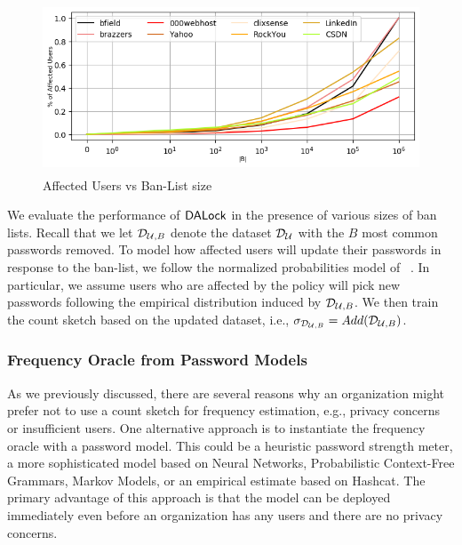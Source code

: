 \begin{figure}[htb]	
	\begin{center}
		\includegraphics[height=2in,width=\linewidth]{Figures/Experiments/AffectedUsers}
		\caption{Affected Users vs Ban-List size}\label{figure: affectedusers}
	\end{center}
\end{figure}




We evaluate the performance of $\mathsf{DALock}$ in the presence of various sizes of ban lists. Recall that we let $\mathcal{D}_{{\mathcal{U}, B}}$ denote the dataset $\mathcal{D}_{{\mathcal{U}}}$ with the $B$ most common passwords removed. To model how affected users will update their passwords in response to the ban-list, we follow the normalized probabilities model of ~\cite{BKPS:ACMEC13}. In particular, we assume users who are affected by the policy will pick new passwords following the empirical distribution induced by $\mathcal{D}_{{\mathcal{U}, B}}$. We then train the count sketch based on the updated dataset, i.e., $\sigma_{\mathcal{D}_{{\mathcal{U}, B}}} = Add(\mathcal{D}_{{\mathcal{U}, B}})$.




\subsubsection{Frequency Oracle from Password Models}


As we previously discussed, there are several reasons why an organization might prefer not to use a count sketch for frequency estimation, e.g., privacy concerns or insufficient users. One alternative approach is to instantiate the frequency oracle with a password model. This could be a heuristic password strength meter, a more sophisticated model based on Neural Networks, Probabilistic Context-Free Grammars,  Markov Models, or an empirical estimate based on Hashcat. The primary advantage of this approach is that the model can be deployed immediately even before an organization has any users and there are no privacy concerns. 


